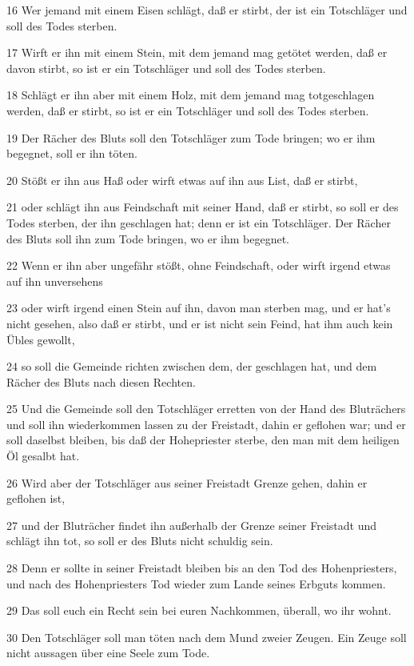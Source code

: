 \par 16 Wer jemand mit einem Eisen schlägt, daß er stirbt, der ist ein Totschläger und soll des Todes sterben.
\par 17 Wirft er ihn mit einem Stein, mit dem jemand mag getötet werden, daß er davon stirbt, so ist er ein Totschläger und soll des Todes sterben.
\par 18 Schlägt er ihn aber mit einem Holz, mit dem jemand mag totgeschlagen werden, daß er stirbt, so ist er ein Totschläger und soll des Todes sterben.
\par 19 Der Rächer des Bluts soll den Totschläger zum Tode bringen; wo er ihm begegnet, soll er ihn töten.
\par 20 Stößt er ihn aus Haß oder wirft etwas auf ihn aus List, daß er stirbt,
\par 21 oder schlägt ihn aus Feindschaft mit seiner Hand, daß er stirbt, so soll er des Todes sterben, der ihn geschlagen hat; denn er ist ein Totschläger. Der Rächer des Bluts soll ihn zum Tode bringen, wo er ihm begegnet.
\par 22 Wenn er ihn aber ungefähr stößt, ohne Feindschaft, oder wirft irgend etwas auf ihn unversehens
\par 23 oder wirft irgend einen Stein auf ihn, davon man sterben mag, und er hat's nicht gesehen, also daß er stirbt, und er ist nicht sein Feind, hat ihm auch kein Übles gewollt,
\par 24 so soll die Gemeinde richten zwischen dem, der geschlagen hat, und dem Rächer des Bluts nach diesen Rechten.
\par 25 Und die Gemeinde soll den Totschläger erretten von der Hand des Bluträchers und soll ihn wiederkommen lassen zu der Freistadt, dahin er geflohen war; und er soll daselbst bleiben, bis daß der Hohepriester sterbe, den man mit dem heiligen Öl gesalbt hat.
\par 26 Wird aber der Totschläger aus seiner Freistadt Grenze gehen, dahin er geflohen ist,
\par 27 und der Bluträcher findet ihn außerhalb der Grenze seiner Freistadt und schlägt ihn tot, so soll er des Bluts nicht schuldig sein.
\par 28 Denn er sollte in seiner Freistadt bleiben bis an den Tod des Hohenpriesters, und nach des Hohenpriesters Tod wieder zum Lande seines Erbguts kommen.
\par 29 Das soll euch ein Recht sein bei euren Nachkommen, überall, wo ihr wohnt.
\par 30 Den Totschläger soll man töten nach dem Mund zweier Zeugen. Ein Zeuge soll nicht aussagen über eine Seele zum Tode.
